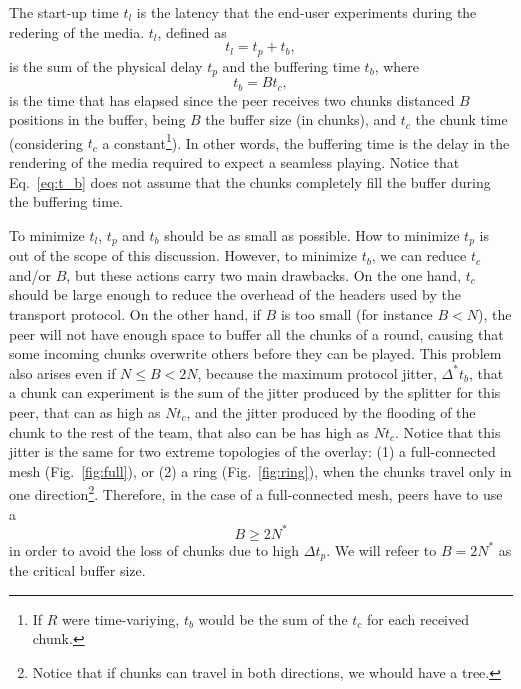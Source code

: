 

\label{sec:latency}


The start-up time $t_l$ is the latency that the end-user experiments
during the redering of the media. $t_l$, defined as
\begin{equation}
  \label{eq:t_l}
  t_l = t_p + t_b,
\end{equation}
is the sum of the physical
delay $t_p$ and the buffering time $t_b$, where
\begin{equation}
  \label{eq:t_b}
  t_b = Bt_c,
\end{equation}
is the time that has elapsed since the peer receives two chunks
distanced $B$ positions in the buffer, being $B$ the buffer size (in
chunks), and $t_c$ the chunk time (considering $t_c$ a
constant\footnote{If $R$ were time-variying, $t_b$ would be the sum of
  the $t_c$ for each received chunk.}). In other words, the buffering
time is the delay in the rendering of the media required to expect a
seamless playing. Notice that Eq.~\ref{eq:t_b} does not assume that
the chunks completely fill the buffer during the buffering time.

To minimize $t_l$, $t_p$ and $t_b$ should be as small as possible. How
to minimize $t_p$ is out of the scope of this discussion. However, to
minimize $t_b$, we can reduce $t_c$ and/or $B$, but these actions
carry two main drawbacks. On the one hand, $t_c$ should be large
enough to reduce the overhead of the headers used by the transport
protocol. On the other hand, if $B$ is too small (for instance $B<N$),
the peer will not have enough space to buffer all the chunks of a
round, causing that some incoming chunks overwrite others before they
can be played. This problem also arises even if $N\leq B<2N$, because
the maximum protocol jitter, $\Delta^* t_b$, that a chunk can
experiment is the sum of the jitter produced by the splitter for this
peer, that can as high as $Nt_c$, and the jitter produced by the
flooding of the chunk to the rest of the team, that also can be has
high as $Nt_c$. Notice that this jitter is the same for two extreme
topologies of the overlay: (1) a full-connected mesh
(Fig.~\ref{fig:full}), or (2) a ring (Fig.~\ref{fig:ring}), when the
chunks travel only in one direction\footnote{Notice that if chunks can
  travel in both directions, we whould have a tree.}. Therefore, in
the case of a full-connected mesh, peers have to use a
\begin{equation}
  \label{eq:minimum_B}
  B\ge 2N^*
\end{equation}
in order to avoid the loss of chunks due to high $\Delta t_p$. We will
refeer to $B=2N^*$ as the critical buffer size.

